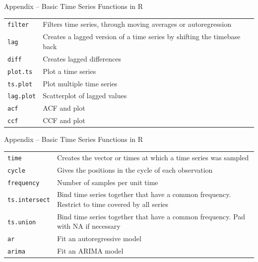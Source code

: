 \documentclass[ignorenonframetext,xcolor=x11names]{beamer}
\begin{document}


\begin{frame}{Appendix -- Basic Time Series Functions in R}
\footnotesize
\renewcommand{\arraystretch}{1.25}
\begin{tabularx}{\textwidth}{l|X} \hline
\texttt{filter} & Filters time series, through moving averages or autoregression \\
\texttt{lag} & Creates a lagged version of a time series by shifting the timebase back \\
\texttt{diff} & Creates lagged differences \\ 
\texttt{plot.ts} & Plot a time series \\
\texttt{ts.plot} & Plot multiple time series \\
\texttt{lag.plot} & Scatterplot of lagged values \\
\texttt{acf} & ACF and plot \\
\texttt{ccf} & CCF and plot \\ \hline
\end{tabularx}
\end{frame}

\begin{frame}{Appendix -- Basic Time Series Functions in R}
\footnotesize
\renewcommand{\arraystretch}{1.25}
\begin{tabularx}{\textwidth}{l|X} \hline
\texttt{time} & Creates the vector or times at which a time series was sampled \\
\texttt{cycle} & Gives the positions in the cycle of each observation \\
\texttt{frequency} & Number of samples per unit time \\
\texttt{ts.intersect} & Bind time series together that have a common frequency. Restrict to time covered by all series \\
\texttt{ts.union} & Bind time series together that have a common frequency. Pad with NA if necessary \\ 
\texttt{ar} & Fit an autoregressive model \\ 
\texttt{arima} & Fit an ARIMA model \\ \hline
\end{tabularx}
\end{frame}
\end{document}
